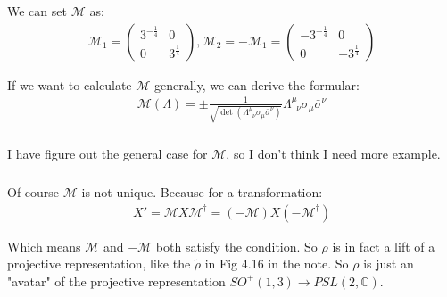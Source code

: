 \documentclass[]{ctexart}
\begin{document}
			We can set $\mathcal{M}$ as:
				\begin{equation*}
				\begin{aligned}
					\mathcal{M}_1=
					\begin{pmatrix}
					3^{-\frac{1}{4}} & 0\\
					0 & 3^{\frac{1}{4}}
					\end{pmatrix},
					\mathcal{M}_2=
					-\mathcal{M}_1=
					\begin{pmatrix}
					-3^{-\frac{1}{4}} & 0\\
					0 & -3^{\frac{1}{4}}
					\end{pmatrix}
				\end{aligned}
				\end{equation*}
			
			If we want to calculate $\mathcal{M}$ generally, we can derive the formular:
				\begin{equation*}
				\begin{aligned}
					\mathcal{M}(\Lambda)=\pm \frac{1}{\sqrt{\det\left(\Lambda^{\mu}_{\;\;\nu}\sigma_{\mu}\bar{\sigma}^{\nu}\right)}}\Lambda^{\mu}_{\;\;\nu}\sigma_{\mu}\bar{\sigma}^{\nu}
				\end{aligned}
				\end{equation*}
			
		\subsubsection{}
			I have figure out the general case for $\mathcal{M}$, so I don't think I need more example. 
		
		\subsubsection{}
			Of course $\mathcal{M}$ is not unique. Because for a transformation:
				\begin{equation*}
				\begin{aligned}
					X'=\mathcal{M}X\mathcal{M}^{\dagger}=(-\mathcal{M})X(-\mathcal{M}^{\dagger})
				\end{aligned}
				\end{equation*}
			
			Which means $\mathcal{M}$ and $-\mathcal{M}$ both satisfy the condition. So $\rho$ is in fact a lift of a projective representation, like the $\tilde{\rho}$ in Fig 4.16 in the note. So $\rho $ is just an "avatar" of the projective representation $SO^+(1,3)\rightarrow PSL(2,\mathbb{C})$. 
		
\end{document}
